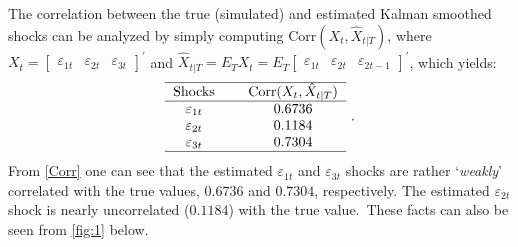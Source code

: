 \documentclass[a4paper,final,12pt]{article}
\begin{document}
The correlation between the true (simulated) and estimated Kalman smoothed
shocks can be analyzed by simply computing $\mathrm{Corr}(X_{t},\hat{X}%
_{t|T})$, where $X_{t}=%
\begin{bmatrix}
\varepsilon _{1t} & \varepsilon _{2t} & \varepsilon _{3t}%
\end{bmatrix}%
^{\prime }$ and $\hat{X}_{t|T}=E_{T}X_{t}=E_{T}%
\begin{bmatrix}
\varepsilon _{1t} & \varepsilon _{2t} & \varepsilon _{2t-1}%
\end{bmatrix}%
^{\prime }$, which yields:%
\begin{equation}
\begin{tabular}{ccc}
\hline
Shocks &  & $\mathrm{Corr}(X_{t},\hat{X}_{t|T})$ \\ \hline
$\varepsilon _{1t}$ &  & $0.6736$ \\ 
$\varepsilon _{2t}$ &  & $0.1184$ \\ 
$\varepsilon _{3t}$ &  & $0.7304$ \\ \hline
\end{tabular}%
~.  \label{Corr}
\end{equation}%
From \ref{Corr} one can see that the estimated $\varepsilon _{1t}$ and $%
\varepsilon _{3t}$ shocks are rather `\emph{weakly}' correlated with the
true values, $0.6736$ and $0.7304$, respectively. The estimated $\varepsilon
_{2t}$ shock is nearly uncorrelated ($0.1184$) with the true value.\ These
facts can also be seen from \autoref{fig:1} below.
\end{document}

